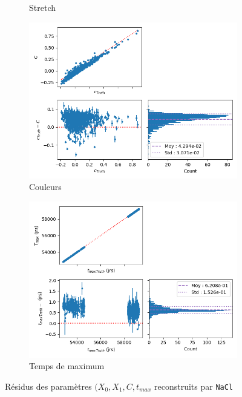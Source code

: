 \documentclass{book}
\def\nacl{\texttt{NaCl}\xspace}
\begin{document}
\begin{figure}
\begin{subfigure}{0.45\textwidth}
		\caption{Stretch}
		\label{fig:nacl_x1}
	\end{subfigure}
	\hfill
	\begin{subfigure}{0.45\textwidth}
		\centering
		\includegraphics[width=\textwidth]{figures/nacl_c.png}
		\caption{Couleurs}
		\label{fig:nacl_c}
	\end{subfigure}
	\hfill
	\begin{subfigure}{0.45\textwidth}
		\centering
		\includegraphics[width=\textwidth]{figures/nacl_tmax.png}
		\caption{Temps de maximum }
		\label{fig:nacl_tmax}
	\end{subfigure}
	\caption{Résidus des paramètres $(X_0, X_1, C, t_{max}$ reconstruits par \nacl}
	\label{fig:nacl_residuals}
\end{figure}
\end{document}
